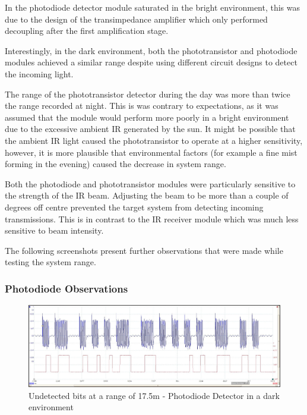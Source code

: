 In the photodiode detector module saturated in the bright environment, this was due to the design of the transimpedance amplifier which only performed decoupling after the first amplification stage.

Interestingly, in the dark environment, both the phototransistor and photodiode modules achieved a similar range despite using different circuit designs to detect the incoming light.

The range of the phototransistor detector during the day was more than twice the range recorded at night. This is was contrary to expectations, as it was assumed that the module would perform more poorly in a bright environment due to the excessive ambient IR generated by the sun.
It might be possible that the ambient IR light caused the phototransistor to operate at a higher sensitivity, however, it is more plausible that environmental factors (for example a fine mist forming in the evening) caused the decrease in system range.

Both the photodiode and phototransistor modules were particularly sensitive to the strength of the IR beam. Adjusting the beam to be more than a couple of degrees off centre prevented the target system from detecting incoming transmissions. This is in contrast to the IR receiver module which was much less sensitive to beam intensity.

The following screenshots present further observations that were made while testing the system range. %


\subsubsection{Photodiode Observations}
\begin{figure}[H]
	\centering
	\includegraphics[width=.9\textwidth]{figures/results/drak_system_test/photodiode1750cm_missed_bits.jpg}
	\caption{Undetected bits at a range of 17.5m - Photodiode Detector in a dark environment}
	\label{fig:photodiode_bit_error}
\end{figure}


